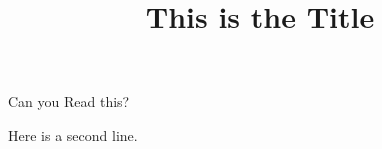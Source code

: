 \documentclass{ximera}
\title{This is the Title}
\begin{document}
\maketitle
Can you Read this?

Here is a second line.
\end{document}
